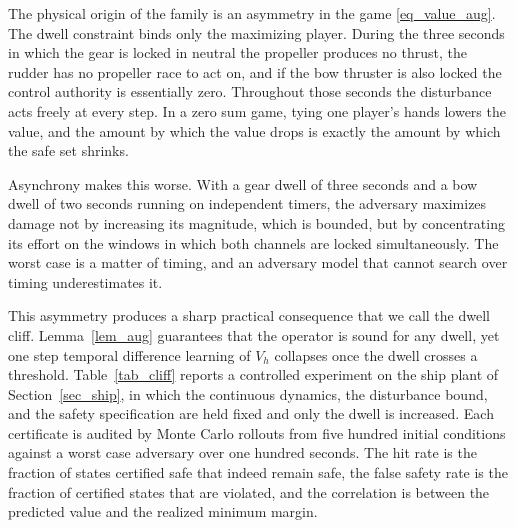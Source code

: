 \documentclass[journal]{IEEEtran}
\begin{document}
The physical origin of the family is an asymmetry in the game \eqref{eq_value_aug}. The dwell constraint binds only the maximizing player. During the three seconds in which the gear is locked in neutral the propeller produces no thrust, the rudder has no propeller race to act on, and if the bow thruster is also locked the control authority is essentially zero. Throughout those seconds the disturbance acts freely at every step. In a zero sum game, tying one player's hands lowers the value, and the amount by which the value drops is exactly the amount by which the safe set shrinks.

Asynchrony makes this worse. With a gear dwell of three seconds and a bow dwell of two seconds running on independent timers, the adversary maximizes damage not by increasing its magnitude, which is bounded, but by concentrating its effort on the windows in which both channels are locked simultaneously. The worst case is a matter of timing, and an adversary model that cannot search over timing underestimates it.

This asymmetry produces a sharp practical consequence that we call the dwell cliff. Lemma~\ref{lem_aug} guarantees that the operator is sound for any dwell, yet one step temporal difference learning of $V_h$ collapses once the dwell crosses a threshold. Table~\ref{tab_cliff} reports a controlled experiment on the ship plant of Section~\ref{sec_ship}, in which the continuous dynamics, the disturbance bound, and the safety specification are held fixed and only the dwell is increased. Each certificate is audited by Monte Carlo rollouts from five hundred initial conditions against a worst case adversary over one hundred seconds. The hit rate is the fraction of states certified safe that indeed remain safe, the false safety rate is the fraction of certified states that are violated, and the correlation is between the predicted value and the realized minimum margin.
\end{document}
